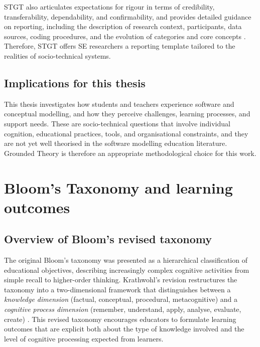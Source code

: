 STGT also articulates expectations for rigour in terms of credibility, transferability, dependability, and confirmability, and provides detailed guidance on reporting, including the description of research context, participants, data sources, coding procedures, and the evolution of categories and core concepts \cite{hoda2018socio}. Therefore, STGT offers SE researchers a reporting template tailored to the realities of socio-technical systems.


\subsection{Implications for this thesis}
\label{subsec:gt_implications_thesis}

This thesis investigates how students and teachers experience software and conceptual modelling, and how they perceive challenges, learning processes, and support needs. These are socio-technical questions that involve individual cognition, educational practices, tools, and organisational constraints, and they are not yet well theorised in the software modelling education literature. Grounded Theory is therefore an appropriate methodological choice for this work.


\section{Bloom's Taxonomy and learning outcomes}
\label{sec:blooms_taxonomy}

\subsection{Overview of Bloom's revised taxonomy}
\label{subsec:bloom_overview}

The original Bloom's taxonomy was presented as a hierarchical classification of educational objectives, describing increasingly complex cognitive activities from simple recall to higher-order thinking. Krathwohl's revision restructures the taxonomy into a two-dimensional framework that distinguishes between a \emph{knowledge dimension} (factual, conceptual, procedural, metacognitive) and a \emph{cognitive process dimension} (remember, understand, apply, analyse, evaluate, create) \cite{krathwohl2002revision}. This revised taxonomy encourages educators to formulate learning outcomes that are explicit both about the type of knowledge involved and the level of cognitive processing expected from learners.

